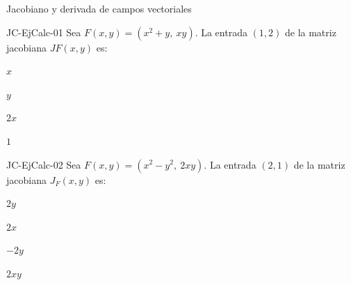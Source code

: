 \documentclass[a4,11pt]{aleph-notas}
\begin{document}
\begin{quiz}{Jacobiano y derivada de campos vectoriales}
\begin{multi}[]%
    {JC-EjCalc-01}
    Sea $F(x,y) = (x^2 + y,\ xy)$. La entrada $(1,2)$ de la matriz jacobiana $JF(x,y)$ es:
    \item* $x$
    \item $y$
    \item $2x$
    \item $1$
\end{multi}

\begin{multi}[]%
    {JC-EjCalc-02}
    Sea $F(x,y) = (x^2 - y^2,\ 2xy)$. La entrada $(2,1)$ de la matriz jacobiana $J_F(x,y)$ es:
    \item* $2y$
    \item $2x$
    \item $-2y$
    \item $2xy$
\end{multi}

\end{quiz}
\end{document}
